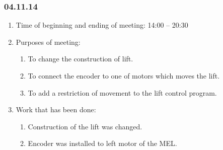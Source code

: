 
\subsubsection{04.11.14}

\begin{enumerate}
	\item Time of beginning and ending of meeting:
	14:00 – 20:30
	\item Purposes of meeting:
	\begin{enumerate}
	  \item To change the construction of lift.
	  
	  \item To connect the encoder to one of motors which moves the lift.
	  
	  \item To add a restriction of movement to the lift control program.
	  
    \end{enumerate}
    
	\item Work that has been done:
	\begin{enumerate}
	  \item Construction of the lift was changed.
      
      \item Encoder was installed to left motor of the MEL.
      

\end{enumerate}
\end{enumerate}
